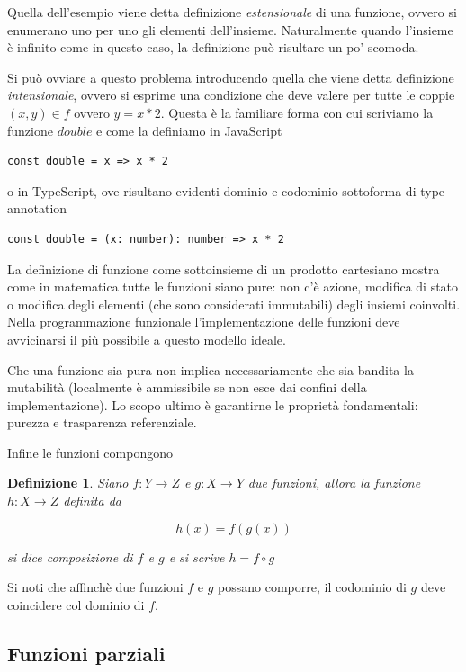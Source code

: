 \documentclass[12pt]{article}
\newtheorem{definition}{Definizione}
\begin{document}
Quella dell'esempio viene detta definizione \emph{estensionale} di una funzione, ovvero si enumerano uno per uno gli elementi dell'insieme.
Naturalmente quando l'insieme è infinito come in questo caso, la definizione può risultare un po' scomoda.

Si può ovviare a questo problema introducendo quella che viene detta definizione \emph{intensionale},
ovvero si esprime una condizione che deve valere per tutte le coppie $(x, y) \in f$ ovvero $y = x * 2$. Questa è la familiare forma con cui scriviamo la funzione $double$ e come la definiamo in JavaScript

\begin{verbatim}
const double = x => x * 2
\end{verbatim}

o in TypeScript, ove risultano evidenti dominio e codominio sottoforma di type annotation

\begin{verbatim}
const double = (x: number): number => x * 2
\end{verbatim}

La definizione di funzione come sottoinsieme di un prodotto cartesiano mostra come in matematica tutte le funzioni siano pure:
non c'è azione, modifica di stato o modifica degli elementi (che sono considerati immutabili) degli insiemi coinvolti.
Nella programmazione funzionale l'implementazione delle funzioni deve avvicinarsi il più possibile a questo modello ideale.

Che una funzione sia pura non implica necessariamente che sia bandita la mutabilità
(localmente è ammissibile se non esce dai confini della implementazione).
Lo scopo ultimo è garantirne le proprietà fondamentali: purezza e trasparenza referenziale.

Infine le funzioni compongono

\begin{definition}
Siano $f: Y \rightarrow Z$ e $g: X \rightarrow Y$ due funzioni, allora la funzione $h: X \rightarrow Z$ definita da

$$
h(x) = f(g(x))
$$

si dice \emph{composizione} di $f$ e $g$ e si scrive $h = f \circ g$

\end{definition}

Si noti che affinchè due funzioni $f$ e $g$ possano comporre, il codominio di $g$ deve coincidere col dominio di $f$.

\subsection{Funzioni parziali}
\end{document}

